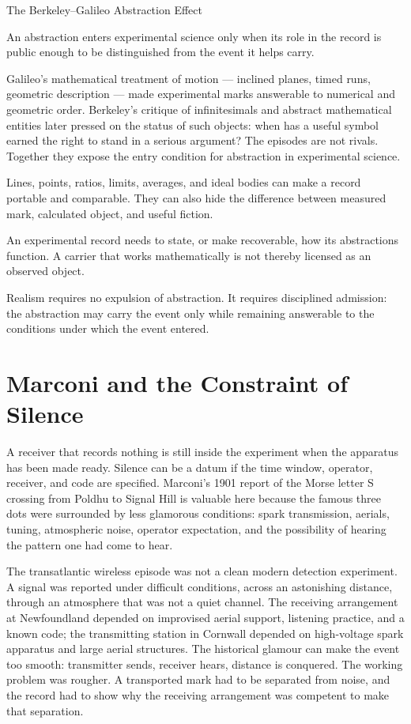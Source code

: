\begin{phenom}{The Berkeley--Galileo Abstraction Effect~\cite{berkeley1734,galileo1638}}
\label{ph:berkeley-galileo-abstraction}

\PhStatement
An abstraction enters experimental science only when its role in the record is
public enough to be distinguished from the event it helps carry.

\PhOrigin
Galileo's mathematical treatment of motion --- inclined planes, timed runs,
geometric description --- made experimental marks answerable to numerical
and geometric order. Berkeley's critique of infinitesimals and abstract
mathematical entities later pressed on the status of such objects: when
has a useful symbol earned the right to stand in a serious argument? The
episodes are not rivals. Together they expose the entry condition for
abstraction in experimental science.

\PhObservation
Lines, points, ratios, limits, averages, and ideal bodies can make a record
portable and comparable. They can also hide the difference between measured
mark, calculated object, and useful fiction.

\PhConstraint
An experimental record needs to state, or make recoverable, how its
abstractions function. A carrier that works mathematically is not thereby
licensed as an observed object.

\PhConsequence
Realism requires no expulsion of abstraction. It requires disciplined
admission: the abstraction may carry the event only while remaining
answerable to the conditions under which the event entered.
\end{phenom}

\section{Marconi and the Constraint of Silence}

A receiver that records nothing is still inside the experiment when the
apparatus has been made ready. Silence can be a datum if the time window,
operator, receiver, and code are specified. Marconi's 1901 report of the Morse
letter S crossing from Poldhu to Signal Hill is valuable here because the famous
three dots were surrounded by less glamorous conditions: spark transmission,
aerials, tuning, atmospheric noise, operator expectation, and the possibility
of hearing the pattern one had come to hear.

The transatlantic wireless episode was not a clean modern detection experiment.
A signal was reported under difficult conditions, across an astonishing
distance, through an atmosphere that was not a quiet channel. The receiving
arrangement at Newfoundland depended on improvised aerial support, listening
practice, and a known code; the transmitting station in Cornwall depended on
high-voltage spark apparatus and large aerial structures. The historical
glamour can make the event too smooth: transmitter sends, receiver hears,
distance is conquered. The working problem was rougher. A transported mark had
to be separated from noise, and the record had to show why the receiving
arrangement was competent to make that separation.

